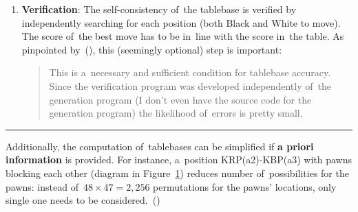 \begin{enumerate}[1]
    Alternatively, Tim Krabbé (\cite{Krabbe2014StillersMonster}) describes retrograde analysis (from perspective of~White to mate) by generating:
    \begin{enumerate}[(1)]
      \item a~database of~all possible positions given the material (see the previous step of~generation),
      \item a~sub-database made of~all positions where Black is mated,
      \item positions where White can reach mate (\acrshort{dtm} = 1),
      \item positions where Black cannot prevent White giving mate next move,
      \item positions where White can always reach a~position where Black cannot prevent him from giving mate next move (\acrshort{dtm} = 2).
      \item And so on, always a~ply%
      \footnote{In standard Chess terminology, one move consists of a~turn by each player.
        Therefore a~\emph{ply} in Chess is a~half-move.
        Thus, after 20 moves in a~Chess game, 40 plies have been completed---20 by White and 20 by Black.}
      further away from mate until all positions connected to mate are found.
    \end{enumerate}
      By connecting these positions back to mate, the shortest path through the database is formed.
      Such a~path contains perfect play:
      White moves towards the quickest mate, Black moves towards the slowest mate (which can be a~draw or even Black's win).

  \item \textbf{Verification}:
    The self-consistency of~the tablebase is verified by independently searching for each position (both Black and White to move).
    The score of~the best move has to be in~line with the score in~the table.
    As pinpointed by~(\cite{Bourzutschky2006sevenman}), this (seemingly optional) step is important:
    \begin{quotation} \noindent
      This is a~necessary and sufficient condition for tablebase accuracy.
      Since the verification program was developed independently of~the generation program (I don't even have the source code for the generation program) the likelihood of~errors is pretty small.
    \end{quotation}
\end{enumerate}

\hrule
\medskip

Additionally, the computation of~tablebases can be simplified if \textbf{a priori information} is provided.
For instance, a~position KRP(a2)-KBP(a3) with pawns blocking each other (diagram in Figure~\ref{fig:KRP(a2)-KBP(a3)}) reduces number of~possibilities for the pawns:
instead of~$48 \times 47 = 2,256$ permutations for the pawns' locations, only single one needs to be considered.~(\cite{Herik1987sixmenendgame})
\begin{figure}[H]
  \centering
  \newgame
  \showboard
  \label{fig:KRP(a2)-KBP(a3)}
\end{figure}

